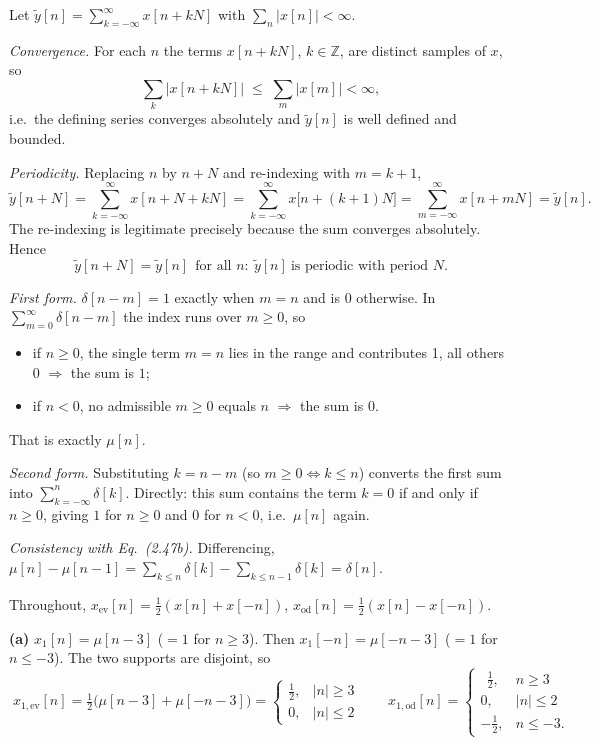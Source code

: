 Let $\displaystyle \tilde{y}[n]=\sum_{k=-\infty}^{\infty}x[n+kN]$ with $\sum_n|x[n]|<\infty$.

\emph{Convergence.} For each $n$ the terms $x[n+kN]$, $k\in\mathbb{Z}$, are distinct samples of
$x$, so
\[
\sum_{k}\bigl|x[n+kN]\bigr|\;\le\;\sum_{m}|x[m]|<\infty,
\]
i.e.\ the defining series converges absolutely and $\tilde y[n]$ is well defined and bounded.

\emph{Periodicity.} Replacing $n$ by $n+N$ and re-indexing with $m=k+1$,
\[
\tilde{y}[n+N]=\sum_{k=-\infty}^{\infty}x[n+N+kN]
             =\sum_{k=-\infty}^{\infty}x\bigl[n+(k+1)N\bigr]
             =\sum_{m=-\infty}^{\infty}x[n+mN]=\tilde{y}[n].
\]
The re-indexing is legitimate precisely because the sum converges absolutely. Hence
\[
\boxed{\;\tilde{y}[n+N]=\tilde{y}[n]\ \ \text{for all }n:\ \tilde{y}[n]\ \text{is periodic with period }N.\;}
\]


\emph{First form.} $\delta[n-m]=1$ exactly when $m=n$ and is $0$ otherwise. In
$\sum_{m=0}^{\infty}\delta[n-m]$ the index runs over $m\ge 0$, so
\begin{itemize}[leftmargin=1.4em,itemsep=0pt]
\item if $n\ge 0$, the single term $m=n$ lies in the range and contributes 1, all others 0
      $\Rightarrow$ the sum is $1$;
\item if $n<0$, no admissible $m\ge0$ equals $n$ $\Rightarrow$ the sum is $0$.
\end{itemize}
That is exactly $\mu[n]$.

\emph{Second form.} Substituting $k=n-m$ (so $m\ge0 \Leftrightarrow k\le n$) converts the first
sum into $\sum_{k=-\infty}^{n}\delta[k]$. Directly: this sum contains the term $k=0$ if and
only if $n\ge0$, giving $1$ for $n\ge0$ and $0$ for $n<0$, i.e.\ $\mu[n]$ again.

\emph{Consistency with Eq.\ (2.47b).} Differencing,
$\mu[n]-\mu[n-1]=\sum_{k\le n}\delta[k]-\sum_{k\le n-1}\delta[k]=\delta[n]$. \checkmark


Throughout, $x_{\mathrm{ev}}[n]=\tfrac12(x[n]+x[-n])$, $x_{\mathrm{od}}[n]=\tfrac12(x[n]-x[-n])$.

\textbf{(a)} $x_1[n]=\mu[n-3]$ ($=1$ for $n\ge 3$). Then $x_1[-n]=\mu[-n-3]$ ($=1$ for
$n\le -3$). The two supports are disjoint, so
\[
\boxed{\;
x_{1,\mathrm{ev}}[n]=\tfrac12\bigl(\mu[n-3]+\mu[-n-3]\bigr)=
\begin{cases}\tfrac12,&|n|\ge 3\\ 0,&|n|\le 2\end{cases}
\qquad
x_{1,\mathrm{od}}[n]=
\begin{cases}\ \ \tfrac12,& n\ge 3\\ 0,&|n|\le 2\\ -\tfrac12,& n\le -3 .\end{cases}\;}
\]


